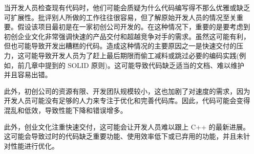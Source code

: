 当开发人员检查现有代码时，他们可能会质疑为什么代码编写得不那么优雅或缺乏可扩展性。批评别人所做的工作往往很容易，但了解原始开发人员的情况至关重要。假设该项目最初是在一家初创公司开发的。在这种情况下，重要的是要考虑到初创企业文化非常强调快速的产品交付和超越竞争对手的需求。虽然这可能有利，但也可能导致开发出糟糕的代码。造成这种情况的主要原因之一是快速交付的压力，这可能导致开发人员为了赶上最后期限而偷工减料或跳过必要的编码实践(例如，前几章中提到的 SOLID 原则)。这可能导致代码缺乏适当的文档、难以维护并且容易出错。

此外，初创公司的资源有限、开发团队规模较小，这也加剧了对速度的需求，因为开发人员可能没有足够的人力来专注于优化和完善代码库。因此，代码可能会变得混乱和低效，导致性能下降和错误增多。

此外，创业文化注重快速交付，这可能会让开发人员难以跟上 C++ 的最新进展。这可能会导致过时的代码缺乏重要功能、使用效率低下或已弃用的功能，并且未针对性能进行优化。
